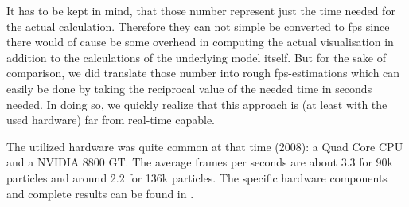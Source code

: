 It has to be kept in mind, that those number represent just the time needed for the actual calculation. Therefore they can not simple be converted to fps since there would of cause be some overhead in computing the actual visualisation in addition to the calculations of the underlying model itself. But for the sake of comparison, we did translate those number into rough fps-estimations which can easily be done by taking the reciprocal value of the needed time in seconds needed. In doing so, we quickly realize that this approach is (at least with the used hardware) far from real-time capable.

The utilized hardware was quite common at that time (2008): a Quad Core CPU and a NVIDIA 8800 GT. The average frames per seconds are about 3.3 for 90k particles and around 2.2 for 136k particles. The specific hardware components and complete results can be found in \cite{krivstof2009hydraulic}.



